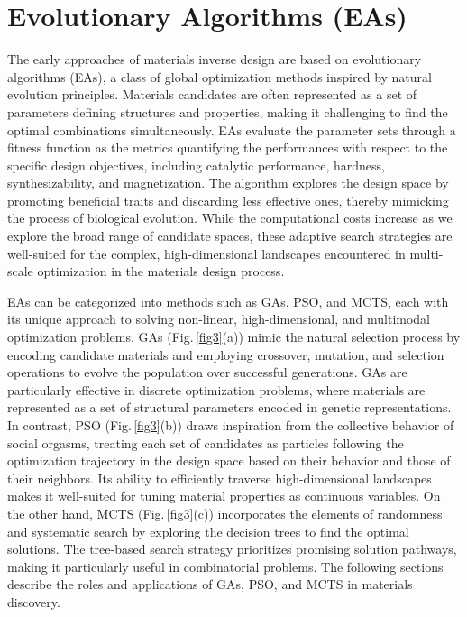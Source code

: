 \documentclass[fleqn,10pt]{wlscirep}
\begin{document}
\section{Evolutionary Algorithms (EAs)}\label{evo}
The early approaches of materials inverse design are based on evolutionary algorithms (EAs), a class of global optimization methods inspired by natural evolution principles. Materials candidates are often represented as a set of parameters defining structures and properties, making it challenging to find the optimal combinations simultaneously. EAs evaluate the parameter sets through a fitness function as the metrics quantifying the performances with respect to the specific design objectives, including catalytic performance, hardness, synthesizability, and magnetization\cite{le2016discovery, allahyari2020coevolutionary}. The algorithm explores the design space by promoting beneficial traits and discarding less effective ones, thereby mimicking the process of biological evolution. While the computational costs increase as we explore the broad range of candidate spaces, these adaptive search strategies are well-suited for the complex, high-dimensional landscapes encountered in multi-scale optimization in the materials design process. 


EAs can be categorized into methods such as GAs, PSO, and MCTS, each with its unique approach to solving non-linear, high-dimensional, and multimodal optimization problems. GAs (Fig.\,\ref{fig3}(a)) mimic the natural selection process by encoding candidate materials and employing crossover, mutation, and selection operations to evolve the population over successful generations. GAs are particularly effective in discrete optimization problems, where materials are represented as a set of structural parameters encoded in genetic representations. In contrast, PSO (Fig.\,\ref{fig3}(b)) draws inspiration from the collective behavior of social orgasms, treating each set of candidates as particles following the optimization trajectory in the design space based on their behavior and those of their neighbors. Its ability to efficiently traverse high-dimensional landscapes makes it well-suited for tuning material properties as continuous variables. On the other hand, MCTS (Fig.\,\ref{fig3}(c)) incorporates the elements of randomness and systematic search by exploring the decision trees to find the optimal solutions. The tree-based search strategy prioritizes promising solution pathways, making it particularly useful in combinatorial problems. The following sections describe the roles and applications of GAs, PSO, and MCTS in materials discovery.
\end{document}
